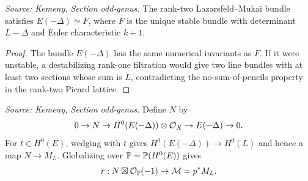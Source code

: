 \begin{lemma}
  \label{lem:kemeny_E_minus_delta_is_F}
  \textit{Source: Kemeny, Section odd-genus.}
  The rank-two Lazarsfeld--Mukai bundle satisfies \(E(-\Delta)\simeq F\), where
  \(F\) is the unique stable bundle with determinant \(L-\Delta\) and Euler
  characteristic \(k+1\).
\end{lemma}
\begin{proof}
  The bundle \(E(-\Delta)\) has the same numerical invariants as \(F\).  If it
  were unstable, a destabilizing rank-one filtration would give two line
  bundles with at least two sections whose sum is \(L\), contradicting the
  no-sum-of-pencils property in the rank-two Picard lattice.
\end{proof}

\begin{definition}
  \label{def:kemeny_odd_kernel_N}
  \textit{Source: Kemeny, Section odd-genus.}
  Define \(N\) by
  \[
    0\to N\to H^0(E(-\Delta))\otimes\mathcal{O}_X\to E(-\Delta)\to0 .
  \]
  For \(t\in H^0(E)\), wedging with \(t\) gives
  \(H^0(E(-\Delta))\to H^0(L)\) and hence a map \(N\to M_L\).  Globalizing over
  \(\mathbb{P}=\mathbb{P}(H^0(E))\) gives
  \[
    r:N\boxtimes\mathcal{O}_{\mathbb{P}}(-1)\to \mathcal M=p^*M_L .
  \]
\end{definition}

